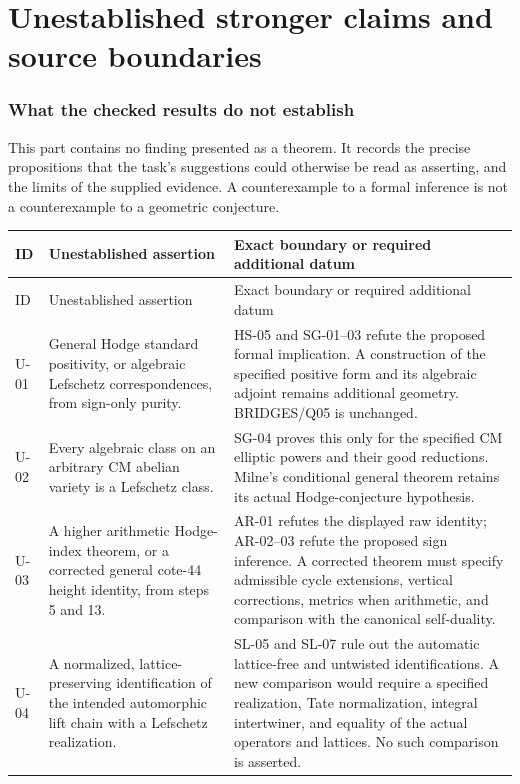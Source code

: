 \part{Unestablished stronger claims and source boundaries}
\section{What the checked results do not establish}

This part contains no finding presented as a theorem.  It records the
precise propositions that the task's suggestions could otherwise be read
as asserting, and the limits of the supplied evidence.  A counterexample
to a formal inference is not a counterexample to a geometric conjecture.

\begin{longtable}{@{}p{}p{}p{}@{}}
\toprule
ID & Unestablished assertion & Exact boundary or required additional datum\\
\midrule
\endfirsthead
\toprule ID & Unestablished assertion & Exact boundary or required additional datum\\
\midrule\endhead
U-01 & General Hodge standard positivity, or algebraic Lefschetz correspondences, from sign-only purity. & HS-05 and SG-01--03 refute the proposed formal implication. A construction of the specified positive form and its algebraic adjoint remains additional geometry. BRIDGES/Q05 is unchanged.\\
U-02 & Every algebraic class on an arbitrary CM abelian variety is a Lefschetz class. & SG-04 proves this only for the specified CM elliptic powers and their good reductions. Milne's conditional general theorem retains its actual Hodge-conjecture hypothesis.\\
U-03 & A higher arithmetic Hodge-index theorem, or a corrected general cote-44 height identity, from steps 5 and 13. & AR-01 refutes the displayed raw identity; AR-02--03 refute the proposed sign inference. A corrected theorem must specify admissible cycle extensions, vertical corrections, metrics when arithmetic, and comparison with the canonical self-duality.\\
U-04 & A normalized, lattice-preserving identification of the intended automorphic lift chain with a Lefschetz realization. & SL-05 and SL-07 rule out the automatic lattice-free and untwisted identifications. A new comparison would require a specified realization, Tate normalization, integral intertwiner, and equality of the actual operators and lattices. No such comparison is asserted.\\

\end{longtable}
